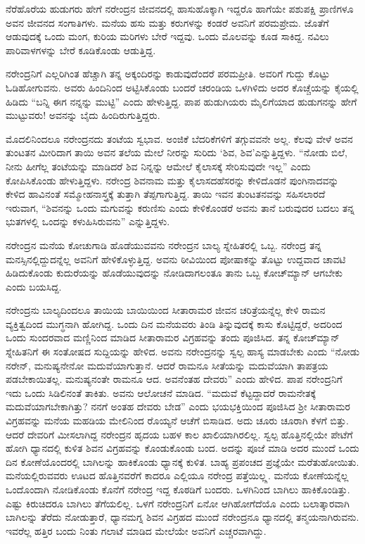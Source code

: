 ನೆರೆಹೊರೆಯ ಹುಡುಗರು ಹೇಗೆ ನರೇಂದ್ರನ ಜೀವನದಲ್ಲಿ ಹಾಸುಹೊಕ್ಕಾಗಿ ಇದ್ದರೊ ಹಾಗೆಯೇ ಪಶುಪಕ್ಷಿ ಪ್ರಾಣಿಗಳೂ ಅವನ ಜೀವನದ ಸಂಗಾತಿಗಳು. ಮನೆಯ ಹಸು ಮತ್ತು ಕರುಗಳನ್ನು ಕಂಡರೆ ಅವನಿಗೆ ಪರಮಪ್ರೇಮ. ಜೊತೆಗೆ ಆಡುವುದಕ್ಕೆ ಒಂದು ಮಂಗ, ಕುರಿಯ ಮರಿಗಳು ಬೇರೆ ಇದ್ದವು. ಒಂದು ಮೊಲವನ್ನು ಕೂಡ ಸಾಕಿದ್ದ. ನವಿಲು ಪಾರಿವಾಳಗಳನ್ನು ಬೇರೆ ಕೂಡಿಕೊಂಡು ಆಡುತ್ತಿದ್ದ.

ನರೇಂದ್ರನಿಗೆ ಎಲ್ಲರಿಗಿಂತ ಹೆಚ್ಚಾಗಿ ತನ್ನ ಅಕ್ಕಂದಿರನ್ನು ಕಾಡುವುದೆಂದರೆ ಪರಮ\-ಪ್ರೀತಿ. ಅವರಿಗೆ ಗುದ್ದು ಕೊಟ್ಟು ಓಡಿಹೋಗುವನು. ಅವರು ಹಿಂದಿನಿಂದ ಅಟ್ಟಿಸಿಕೊಂಡು ಬಂದರೆ ಚರಂಡಿಯ ಒಳಗಿಳಿದು ಅದರ ಕೊಚ್ಚೆಯನ್ನು ಕೈಯಲ್ಲಿ ಹಿಡಿದು “ಬನ್ನಿ ಈಗ ನನ್ನನ್ನು ಮುಟ್ಟಿ” ಎಂದು ಹೇಳುತ್ತಿದ್ದ. ಪಾಪ ಹುಡುಗಿಯರು ಮೈಲಿಗೆಯಾದ ಹುಡುಗನನ್ನು ಹೇಗೆ ಮುಟ್ಟುವರು! ಅವನನ್ನು ಬೈದು ಹಿಂದಿರುಗುತ್ತಿದ್ದರು.

ಮೊದಲಿನಿಂದಲೂ ನರೇಂದ್ರನದು ತಂಟೆಯ ಸ್ವಭಾವ. ಅಂಜಿಕೆ ಬೆದರಿಕೆಗಳಿಗೆ ತಗ್ಗುವವನೇ ಅಲ್ಲ. ಕೆಲವು ವೇಳೆ ಅವನ ತುಂಟತನ ಮೀರಿದಾಗ ತಾಯಿ ಅವನ ತಲೆಯ ಮೇಲೆ ನೀರನ್ನು ಸುರಿದು ‘ಶಿವ, ಶಿವ’ಎನ್ನುತ್ತಿದ್ದಳು. “ನೋಡು ಬಿಲೆ, ನೀನು ಹೀಗೆಲ್ಲ ತಂಟೆಯನ್ನು ಮಾಡಿದರೆ ಶಿವ ನಿನ್ನನ್ನು ಆಮೇಲೆ ಕೈಲಾಸಕ್ಕೆ ಸೇರಿಸುವುದೇ ಇಲ್ಲ” ಎಂದು ಕೋಪಿಸಿಕೊಂಡು ಹೇಳುತ್ತಿದ್ದಳು. ನರೇಂದ್ರ ಶಿವನಾಮ ಮತ್ತು ಕೈಲಾಸದ\break ಹೆಸರನ್ನು ಕೇಳಿದೊಡನೆ ಪುಂಗಿನಾದವನ್ನು ಕೇಳಿದ ಹಾವಿನಂತೆ ಸಮ್ಮೋಹನಾಸ್ತ್ರಕ್ಕೆ ತುತ್ತಾಗಿ ತೆಪ್ಪಗಾಗುತ್ತಿದ್ದ. ತಾಯಿ ಇವನ ತುಂಟತನವನ್ನು ಸಹಿಸಲಾರದೆ ಇರುವಾಗ, “ಶಿವನನ್ನು ಒಂದು ಮಗುವನ್ನು ಕರುಣಿಸು ಎಂದು ಕೇಳಿಕೊಂಡರೆ ಅವನು ತಾನೆ ಬರುವುದರ ಬದಲು ತನ್ನ ಭುತಗಳಲ್ಲಿ ಒಂದನ್ನು ಕಳುಹಿಸಿರುವನು” ಎನ್ನುತ್ತಿದ್ದಳು.

ನರೇಂದ್ರನ ಮನೆಯ ಕೋಚುಗಾಡಿ ಹೊಡೆಯುವವನು ನರೇಂದ್ರನ ಬಾಲ್ಯ ಸ್ನೇಹಿತರಲ್ಲಿ ಒಬ್ಬ. ನರೇಂದ್ರ ತನ್ನ ಮನಸ್ಸಿನಲ್ಲಿದ್ದುದನ್ನೆಲ್ಲ ಅವನಿಗೆ ಹೇಳಿಕೊಳ್ಳುತ್ತಿದ್ದ. ಅವನು ಠೀವಿಯಿಂದ ಪೋಷಾಕನ್ನು ತೊಟ್ಟು ಉದ್ದವಾದ ಚಾವಟಿ ಹಿಡಿದುಕೊಂಡು ಕುದುರೆಯನ್ನು ಹೊಡೆಯುವುದನ್ನು ನೋಡಿದಾಗಲಂತೂ ತಾನು ಒಬ್ಬ ಕೋಚ್‍ಮ್ಯಾನ್ ಆಗಬೇಕು ಎಂದು ಬಯಸಿದ್ದ.

ನರೇಂದ್ರನು ಬಾಲ್ಯದಿಂದಲೂ ತಾಯಿಯ ಬಾಯಿಯಿಂದ ಸೀತಾರಾಮರ ಜೀವನ ಚರಿತ್ರೆಯನ್ನೆಲ್ಲ ಕೇಳಿ ರಾಮನ ವ್ಯಕ್ತಿತ್ವದಿಂದ ಮುಗ್ಧನಾಗಿ ಹೋಗಿದ್ದ. ಒಂದು ದಿನ ಮನೆಯವರು ತಿಂಡಿ ತಿನ್ನುವುದಕ್ಕೆ ಕಾಸು ಕೊಟ್ಟಿದ್ದರೆ, ಅದರಿಂದ ಒಂದು ಸುಂದರವಾದ ಮಣ್ಣಿನಿಂದ ಮಾಡಿದ ಸೀತಾರಾಮರ ವಿಗ್ರಹವನ್ನು ತಂದು ಪೂಜಿಸಿದ. ತನ್ನ ಕೋಚ್‍ಮ್ಯಾನ್ ಸ್ನೇಹಿತನಿಗೆ ಈ ಸಂತೋಷದ ಸುದ್ದಿಯನ್ನು ಹೇಳಿದ. ಅವನು ನರೇಂದ್ರನನ್ನು ಸ್ವಲ್ಪ ಹಾಸ್ಯ ಮಾಡಬೇಕು ಎಂದು “ನೋಡು ನರೇನ್, ಮನುಷ್ಯನೇನೋ ಮದುವೆಯಾಗುತ್ತಾನೆ. ಆದರೆ ರಾಮನೂ ಸೀತೆಯನ್ನು ಮದುವೆಯಾಗಿ ತಾಪತ್ರಯ ಪಡಬೇಕಾಯಿತಲ್ಲ. ಮನುಷ್ಯನಂತೇ ರಾಮನೂ ಆದ. ಅವನೆಂತಹ ದೇವರು” ಎಂದು ಹೇಳಿದ. ಪಾಪ ನರೇಂದ್ರನಿಗೆ ಇದು ಒಂದು ಸಿಡಿಲಿನಂತೆ ತಾಕಿತು. ಅವನು ಆಲೋಚನೆ ಮಾಡಿದ. “ಮದುವೆ ಕೆಟ್ಟದ್ದಾದರೆ ರಾಮನೇತಕ್ಕೆ ಮದುವೆಯಾಗಬೇಕಾಗಿತ್ತು? ನನಗೆ ಅಂತಹ ದೇವರು ಬೇಡ” ಎಂದು ಭಯಭಕ್ತಿಯಿಂದ ಪೂಜಿಸಿದ ಶ‍್ರೀ ಸೀತಾರಾಮರ ವಿಗ್ರಹವನ್ನು ಮನೆಯ ಮಹಡಿಯ ಮೇಲಿನಿಂದ ರೊಯ್ಯನೆ ಆಚೆಗೆ ಬಿಸಾಡಿದ. ಅದು ಚೂರು ಚೂರಾಗಿ ಕೆಳಗೆ ಬಿತ್ತು. ಆದರೆ ದೇವರಿಗೆ ಮೀಸಲಾಗಿದ್ದ ನರೇಂದ್ರನ ಹೃದಯ ಬಹಳ ಕಾಲ ಖಾಲಿಯಾಗಿರಲಿಲ್ಲ. ಸ್ವಲ್ಪ ಹೊತ್ತಿನಲ್ಲಿಯೇ ಪೇಟೆಗೆ ಹೋಗಿ ಧ್ಯಾನದಲ್ಲಿ ಕುಳಿತ ಶಿವನ ವಿಗ್ರಹವನ್ನು ಕೊಂಡುಕೊಂಡು ಬಂದ. ಅದನ್ನು ಪೂಜೆ ಮಾಡಿ ಅದರ ಮುಂದೆ ಒಂದು ದಿನ ಕೋಣೆಯೊಂದರಲ್ಲಿ ಬಾಗಿಲನ್ನು ಹಾಕಿಕೊಂಡು ಧ್ಯಾನಕ್ಕೆ ಕುಳಿತ. ಬಾಹ್ಯ ಪ್ರಪಂಚದ ಪ್ರಜ್ಞೆಯೇ ಮರೆತುಹೋಯಿತು. ಮನೆಯಲ್ಲಿರುವವರು ಊಟದ ಹೊತ್ತಿನವರೆಗೆ ಕಾದರೂ ಎಲ್ಲಿಯೂ ನರೇಂದ್ರ ಪತ್ತೆಯಿಲ್ಲ್ಲ. ಮನೆಯ ಕೋಣೆಯನ್ನೆಲ್ಲ ಒಂದೊಂದಾಗಿ ನೋಡಿಕೊಂಡು ಕೊನೆಗೆ ನರೇಂದ್ರ ಇದ್ದ ಕೊಠಡಿಗೆ ಬಂದರು. ಒಳಗಿನಿಂದ ಬಾಗಿಲು ಹಾಕಿಕೊಂಡಿತ್ತು. ಎಷ್ಟು ಕಿರುಚಿದರೂ ಬಾಗಿಲು ತೆಗೆಯಲಿಲ್ಲ. ಒಳಗೆ ನರೇಂದ್ರನಿಗೆ ಏನೋ ಆಗಿಹೋಗೆದೆಯೊ ಎಂದು ಬಲಾತ್ಕಾರವಾಗಿ ಬಾಗಿಲನ್ನು ತೆರೆದು ನೋಡುತ್ತಾರೆ, ಧ್ಯಾನಮಗ್ನ ಶಿವನ ವಿಗ್ರಹದ ಮುಂದೆ ನರೇಂದ್ರನೂ ಧ್ಯಾನದಲ್ಲಿ ತನ್ಮಯನಾಗಿರುವನು. ಇವರೆಲ್ಲ ಹತ್ತಿರ ಬಂದು ನಿಂತು ಗಲಾಟೆ ಮಾಡಿದ ಮೇಲೆಯೇ ಅವನಿಗೆ ಎಚ್ಚರವಾಗಿದ್ದು.

